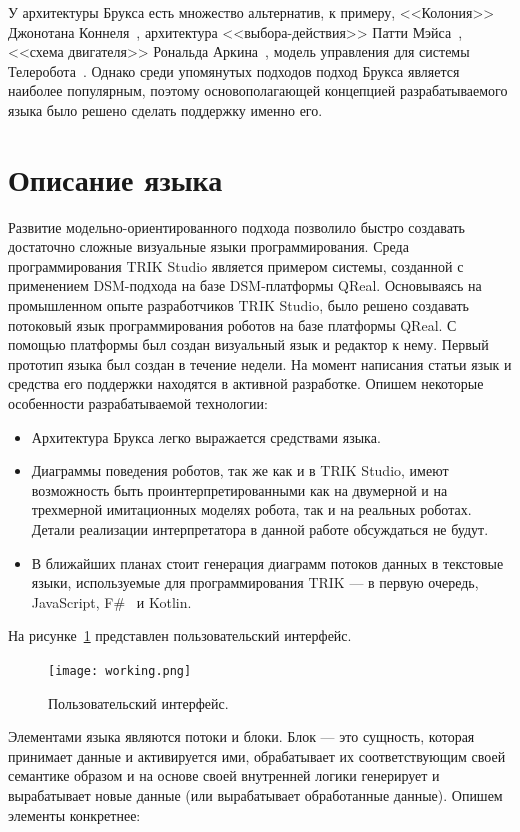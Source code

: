 \documentclass[conference]{IEEEtran}
\begin{document}
	У архитектуры Брукса есть множество альтернатив, к примеру, <<Колония>> Джонотана Коннеля~\cite{connell1989colony}, архитектура <<выбора-действия>> Патти Мэйса~\cite{maes1989dynamics}, <<схема двигателя>> Рональда Аркина~\cite{arkin1987motor}, модель управления для системы Телеробота~\cite{albus1989nasa}. Однако среди упомянутых подходов подход Брукса является наиболее популярным, поэтому основополагающей концепцией разрабатываемого языка было решено сделать поддержку именно его.


\section{Описание языка}
\label{sec:lang}
Развитие модельно-ориентированного подхода позволило быстро создавать достаточно сложные визуальные языки программирования. Среда программирования TRIK Studio является примером системы, созданной с применением DSM-подхода на базе DSM-платформы QReal. Основываясь на промышленном опыте разработчиков TRIK Studio, было решено создавать потоковый язык программирования роботов на базе платформы QReal. С помощью платформы был создан визуальный язык и редактор к нему. Первый прототип языка был создан в течение недели. На момент написания статьи язык и средства его поддержки находятся в активной разработке. Опишем некоторые особенности разрабатываемой технологии:

\begin{itemize}
\item Архитектура Брукса легко выражается средствами языка.
\item Диаграммы поведения роботов, так же как и в TRIK Studio, имеют возможность быть проинтерпретированными как на двумерной и на трехмерной имитационных моделях робота, так и на реальных роботах. Детали реализации интерпретатора в данной работе обсуждаться не будут. 
\item В ближайших планах стоит генерация диаграмм потоков данных в текстовые языки, используемые для программирования TRIK --- в первую очередь, JavaScript, F\#~\cite{kirsanov2014robotics} и Kotlin.
\end{itemize}

На рисунке~\ref{image:work} представлен пользовательский интерфейс.
\begin{figure}[ht]
	\centering
	\texttt{[image: working.png]}
	\caption{Пользовательский интерфейс.}
	\label{image:work}
\end{figure}

Элементами языка являются потоки и блоки. Блок --- это сущность, которая принимает данные и активируется ими, обрабатывает их соответствующим своей семантике образом и на основе своей внутренней логики генерирует и вырабатывает новые данные (или вырабатывает обработанные данные). Опишем элементы конкретнее:
\end{document}
